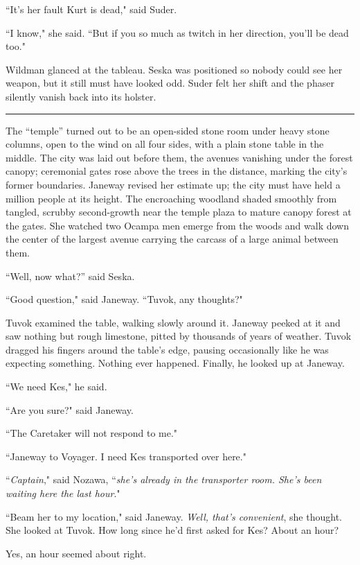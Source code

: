 \documentclass[twoside,letterpaper,12pt]{memoir}
\begin{document}
``It's her fault Kurt is dead," said Suder. 

``I know," she said. ``But if you so much as twitch in her direction, you'll be dead too." 

Wildman glanced at the tableau. Seska was positioned so nobody could see her weapon, but it still must have looked odd. Suder felt her shift and the phaser silently vanish back into its holster. 

\begin{center}\rule{3cm}{0.4 pt}\end{center} 

The ``temple” turned out to be an open-sided stone room under heavy stone columns, open to the wind on all four sides, with a plain stone table in the middle. The city was laid out before them, the avenues vanishing under the forest canopy; ceremonial gates rose above the trees in the distance, marking the city’s former boundaries. Janeway revised her estimate up; the city must have held a million people at its height. The encroaching woodland shaded smoothly from tangled, scrubby second-growth near the temple plaza to mature canopy forest at the gates. She watched two Ocampa men emerge from the woods and walk down the center of the largest avenue carrying the carcass of a large animal between them. 

``Well, now what?” said Seska. 

``Good question," said Janeway. ``Tuvok, any thoughts?" 

Tuvok examined the table, walking slowly around it. Janeway peeked at it and saw nothing but rough limestone, pitted by thousands of years of weather. Tuvok dragged his fingers around the table's edge, pausing occasionally like he was expecting something. Nothing ever happened. Finally, he looked up at Janeway. 

``We need Kes," he said. 

``Are you sure?" said Janeway. 

``The Caretaker will not respond to me." 

``Janeway to Voyager. I need Kes transported over here." 

``\textit{Captain}," said Nozawa, ``\textit{she's already in the transporter room. She's been waiting here the last hour}." 

``Beam her to my location," said Janeway. \textit{Well, that's convenient}, she thought. She looked at Tuvok. How long since he'd first asked for Kes? About an hour? 

Yes, an hour seemed about right. 
\end{document}
